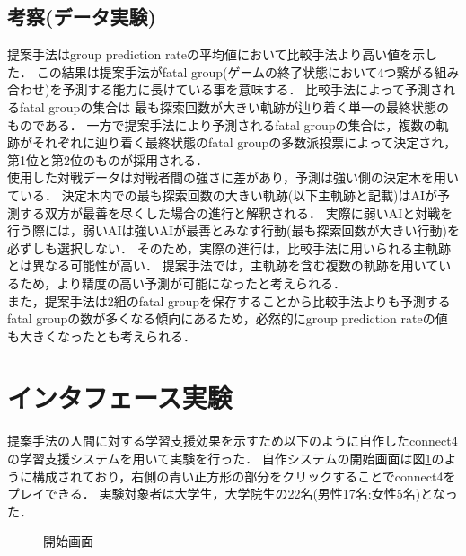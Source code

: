 \subsection{考察(データ実験)}
提案手法はgroup prediction rateの平均値において比較手法より高い値を示した．
この結果は提案手法がfatal group(ゲームの終了状態において4つ繋がる組み合わせ)を予測する能力に長けている事を意味する．
比較手法によって予測されるfatal groupの集合は
最も探索回数が大きい軌跡が辿り着く単一の最終状態のものである．
一方で提案手法により予測されるfatal groupの集合は，複数の軌跡がそれぞれに辿り着く最終状態のfatal groupの多数派投票によって決定され，第1位と第2位のものが採用される．\\
使用した対戦データは対戦者間の強さに差があり，予測は強い側の決定木を用いている．
決定木内での最も探索回数の大きい軌跡(以下主軌跡と記載)はAIが予測する双方が最善を尽くした場合の進行と解釈される．
実際に弱いAIと対戦を行う際には，弱いAIは強いAIが最善とみなす行動(最も探索回数が大きい行動)を必ずしも選択しない．
そのため，実際の進行は，比較手法に用いられる主軌跡とは異なる可能性が高い．
提案手法では，主軌跡を含む複数の軌跡を用いているため，より精度の高い予測が可能になったと考えられる．\\
また，提案手法は2組のfatal groupを保存することから比較手法よりも予測するfatal groupの数が多くなる傾向にあるため，必然的にgroup prediction rateの値も大きくなったとも考えられる．


\section{インタフェース実験}
提案手法の人間に対する学習支援効果を示すため以下のように自作したconnect4の学習支援システムを用いて実験を行った．
自作システムの開始画面は図\ref{fig:basic}のように構成されており，右側の青い正方形の部分をクリックすることでconnect4をプレイできる．
実験対象者は大学生，大学院生の22名(男性17名:女性5名)となった．
\begin{figure}[htbp]
    \centering
    \setlength{\fboxsep}{1pt} %
    \setlength{\fboxrule}{1pt} %
    \caption{開始画面}
    \label{fig:basic}
\end{figure}

